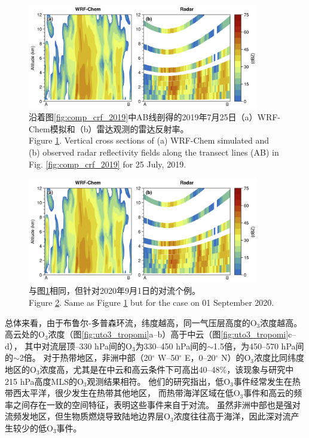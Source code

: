 \begin{figure}[H]
\centering
\includegraphics[width=0.9\textwidth]{./figures/comp_dbzcross_2019.png}
\caption{沿着图\ref{fig:comp_crf_2019}中AB线剖得的2019年7月25日（a）WRF-Chem模拟和（b）雷达观测的雷达反射率。\\
Figure \ref{fig:comp_dbzcross_2019}. Vertical cross sections of (a) WRF-Chem simulated and (b) observed radar reflectivity fields along the transect lines (AB) in Fig. \ref{fig:comp_crf_2019} for 25 July, 2019.}
\label{fig:comp_dbzcross_2019}
\end{figure}

\begin{figure}[H]
\centering
\includegraphics[width=0.9\textwidth]{./figures/comp_dbzcross_2019.png}
\caption{与图\ref{fig:comp_dbzcross_2019}相同，但针对2020年9月1日的对流个例。\\
Figure \ref{fig:comp_dbzcross_2020}. Same as Figure \ref{fig:comp_dbzcross_2019} but for the case on 01 September 2020.}
\label{fig:comp_dbzcross_2020}
\end{figure}

总体来看，由于布鲁尔-多普森环流，纬度越高，同一气压层高度的O$_3$浓度越高。
高云处的O$_3$浓度（图\ref{fig:uto3_tropomi}a--b）高于中云（图\ref{fig:uto3_tropomi}c--d），
其中对流层顶--330 hPa间的O$_3$为330--450 hPa间的$\sim$1.5倍，为450--570 hPa间的$\sim$2倍。
对于热带地区，非洲中部（20$^{\circ}$ W--50$^{\circ}$ E，0--20$^{\circ}$ N）的O$_3$浓度比同纬度地区的O$_3$浓度高，尤其是在中云和高云条件下可高出40--48\%，该现象与\citet{Cooper.2013}研究中215 hPa高度MLS的O$_3$观测结果相符。
他们的研究指出，低O$_3$事件经常发生在热带西太平洋，很少发生在热带其他地区，
而热带海洋区域在低O$_3$事件和高云的频率之间存在一致的空间特征，表明这些事件来自于对流。
虽然非洲中部也是强对流频发地区，但生物质燃烧导致陆地边界层O$_3$浓度往往高于海洋\citep{Thompson.2001,Anderson.2016}，因此深对流产生较少的低O$_3$事件。

